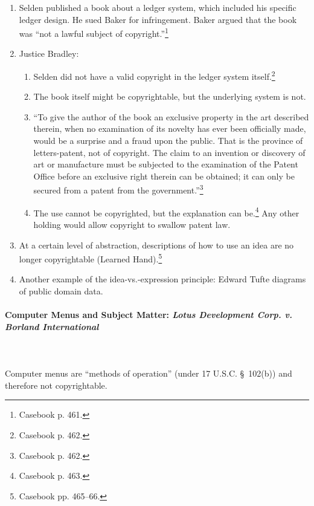 \begin{enumerate}
    \item Selden published a book about a ledger system, which included his 
    specific ledger design. He sued Baker for infringement. Baker argued that 
    the book was ``not a lawful subject of copyright.''\footnote{Casebook p. 
    461.}
    \item Justice Bradley:
    \begin{enumerate}
        \item Selden did not have a valid copyright in the ledger system 
        itself.\footnote{Casebook p. 462.}
        \item The book itself might be copyrightable, but the underlying 
        system is not.
        \item ``To give the author of the book an exclusive property in the 
        art described therein, when no examination of its novelty has ever 
        been officially made, would be a surprise and a fraud upon the public. 
        That is the province of letters-patent, not of copyright. The claim to 
        an invention or discovery of art or manufacture must be subjected to 
        the examination of the Patent Office before an exclusive right therein 
        can be obtained; it can only be secured from a patent from the 
        government.''\footnote{Casebook p. 462.}
        \item The use cannot be copyrighted, but the explanation can 
        be.\footnote{Casebook p. 463.} Any other holding would allow copyright 
        to swallow patent law.
    \end{enumerate}
    \item At a certain level of abstraction, descriptions of how to use an 
    idea are no longer copyrightable (Learned Hand).\footnote{Casebook pp. 
    465--66.}
    \item Another example of the idea-vs.-expression principle: Edward Tufte 
    diagrams of public domain data.
\end{enumerate}

\paragraph{Computer Menus and Subject Matter: \emph{Lotus Development Corp. v. 
Borland International}}
~\\\\
Computer menus are ``methods of operation'' (under 17 U.S.C. \S\ 102(b)) and 
therefore not copyrightable.

